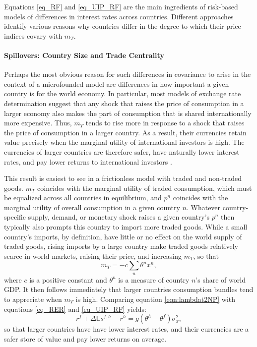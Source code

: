 \documentclass{ar-1col}
\begin{document}
Equations \ref{eq_RF} and \ref{eq_UIP_RF} are the main ingredients of risk-based models of differences in interest rates across countries. Different approaches identify various reasons why countries differ in the degree to which their price indices covary with $m_T$.

\paragraph*{Spillovers: Country Size and Trade Centrality}

Perhaps the most obvious reason for such differences in covariance to arise in the context of a microfounded model are differences in how important a given country is for the world economy. In particular, most models of exchange rate determination suggest that any shock that raises the price of consumption in a larger economy also makes the part of consumption that is shared internationally more expensive. Thus, $m_T$ tends to rise more in response to a shock that raises the price of consumption in a larger country. As a result, their currencies retain value precisely when the marginal utility of international investors is high. The currencies of larger countries are therefore safer, have naturally lower interest rates, and pay lower returns to international investors \citep{Martin2012, Hassan2013}.

This result is easiest to see in a frictionless model with traded and non-traded goods. $m_T$ coincides with the marginal utility of traded consumption, which must be equalized across all countries in equilibrium, and $p^n$ coincides with the marginal utility of overall consumption in a given country $n$. Whatever country-specific supply, demand, or monetary shock raises a given country's $p^n$ then typically also prompts this country to import more traded goods. While a small country's imports, by definition, have little or no effect on the world supply of traded goods, rising imports by a large country make traded goods relatively scarce in world markets, raising their price, and increasing $m_T$, so that
\begin{equation} 
    m_{T} = -c \sum_{n} \theta^n x^n,
    \label{eqn:lambdat2NP}
\end{equation}
where $c$ is a positive constant and $\theta^n$ is a measure of country $n$'s share of world GDP. It then follows immediately that larger countries consumption bundles tend to appreciate when $m_T$ is high. Comparing equation \ref{eqn:lambdat2NP} with equations \ref{eq_RER} and \ref{eq_UIP_RF} yields:
\begin{equation}
  r^{f} + \Delta \mathbb{E} s^{f, h} - r^{h}
  =g\left(\theta^h - \theta^f\right) \sigma_x^2,
  \label{eq_FF_UIP}
\end{equation}
so that larger countries have have lower interest rates, and their currencies are a safer store of value and pay lower returns on average.
  
\end{document}
